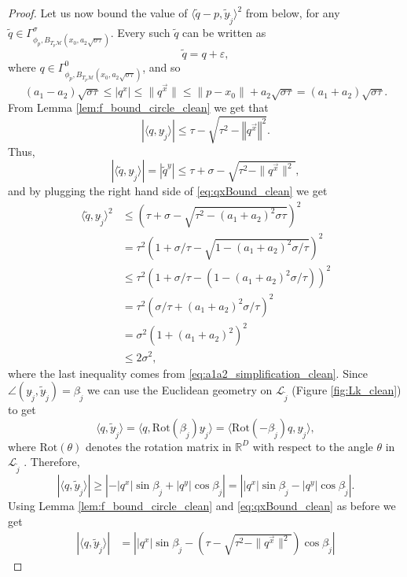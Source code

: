 \documentclass[12pt]{article}
\theoremstyle{remark}
\newcommand{\RR}{\mathbb{R}}
\newcommand{\MM}{\mathcal{M}}
\newcommand{\LL}{\mathcal{L}}
\newcommand{\eps}{\varepsilon}
\newcommand{\abs}[1]{\left\vert #1 \right\vert}
\newcommand{\norm}[1]{\left\Vert #1 \right\Vert}
\newcommand{\lrangle}[1]{\langle #1 \rangle}
\begin{document}
\begin{proof}
Let us now bound the value of $\lrangle{\tilde q - p, \tilde y_{\tilde j}}^2$ from below, for any $\tilde  q\in \Gamma^\sigma_{\phi_p,B_{T_p\MM}(x_0, a_2\sqrt{\sigma\tau})}$.
Every such $\tilde  q$ can be written as
\[
\tilde q = q + \eps
,\]
where $q\in \Gamma^0_{\phi_p,B_{T_p\MM}(x_0, a_2\sqrt{\sigma\tau})}$, and so 
 \begin{equation}\label{eq:qxBound_clean}
 (a_1 - a_2)\sqrt{\sigma\tau}  \leq \abs{q^x} \leq \|q^{\vec{x}}\| \leq \|p-x_0\|+a_2\sqrt{\sigma\tau} = (a_1 + a_2)\sqrt{\sigma\tau}   
.\end{equation}
From Lemma \ref{lem:f_bound_circle_clean} we get that
\[
\abs{\lrangle{q, y_{\tilde j}}} \leq \tau-\sqrt{\tau^2-\norm{q^{\vec{x}}}^2} 
.\]
Thus, 
\[
\abs{\langle \tilde{q}, y_{\tilde j} \rangle} = |\tilde{q}^y| \leq \tau+\sigma-\sqrt{\tau^2-\|q^{\vec{x}}\|^2}
,\]
and by plugging the right hand side of \eqref{eq:qxBound_clean} we get
\begin{align*}
\langle \tilde{q}, y_{\tilde j} \rangle^2 & \leq \left(\tau+ \sigma -\sqrt{\tau^2-(a_1+a_2)^2\sigma\tau}\right)^2
\\& =\tau^2 \left(1+ \sigma/\tau -\sqrt{1-(a_1+a_2)^2\sigma/\tau}\right)^2
\\&\leq \tau^2(1+\sigma/\tau -(1-(a_1+a_2)^2\sigma/\tau))^2
\\&= \tau^2 (\sigma/\tau +  (a_1+a_2)^2\sigma/\tau)^2
\\&=  \sigma^2(1 +  (a_1+a_2)^2)^2
\\&\leq 2\sigma^2
,\end{align*}
where the last inequality comes from \eqref{eq:a1a2_simplification_clean}.
Since $\angle(y_{\tilde j}, \tilde y_{\tilde j}) =\beta_{\tilde j} $ we can use the Euclidean geometry on $\LL_{\tilde j}$ (Figure \ref{fig:Lk_clean}) to get
\[
\lrangle{q, \tilde y_{\tilde j}} = \lrangle{q, \textrm{Rot}(\beta_{\tilde j}) y_{\tilde j}} = \lrangle{\textrm{Rot}(-\beta_{\tilde j}) q,  y_{\tilde j}}
,\]
where $\textrm{Rot}(\theta)$ denotes the rotation matrix in $\RR^D$ with respect to the angle $\theta$ in $\LL_{\tilde j}$ .
Therefore,
$$|\langle q, \tilde{y}_{\tilde j} \rangle| \geq \abs{-|q^x|\sin \beta_{\tilde j}  + |q^y|\cos \beta_{\tilde j}} = \abs{|q^x|\sin \beta_{\tilde j}  - |q^y|\cos \beta_{\tilde j}}.$$
Using Lemma \ref{lem:f_bound_circle_clean} and \eqref{eq:qxBound_clean} as before we get
\begin{align*}
 |\langle q, \tilde{y}_{\tilde j} \rangle| &=\abs{  |q^x|\sin \beta_{\tilde j}  -  \left(\tau-\sqrt{\tau^2-\|q^{\vec{x}}\|^2} \right)\cos \beta_{\tilde j}}

\end{align*}
\end{proof}
\end{document}
